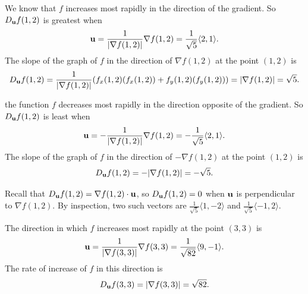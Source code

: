 \begin{activitySolution}
\item We know that $f$ increases most rapidly in the direction of the gradient. So $D_{\mathbf{u}}f(1,2)$ is greatest when \[\mathbf{u} = \frac{1}{|\nabla f(1,2)|} \nabla f(1,2) =  \frac{1}{\sqrt{5}}\langle 2,1 \rangle.\]
The slope of the graph of $f$ in the direction of $\nabla f(1,2)$ at the point $(1,2)$ is
\[D_{\mathbf{u}}f(1,2) = \frac{1}{|\nabla f(1,2)|}(f_x(1,2)(f_x(1,2)) + f_y(1,2)(f_y(1,2))) = |\nabla f(1,2)| = \sqrt{5}.\]

\item the function $f$ decreases most rapidly in the direction opposite of the gradient. So $D_{\mathbf{u}}f(1,2)$ is least when 
\[\mathbf{u} = -\frac{1}{|\nabla f(1,2)|} \nabla f(1,2) =  -\frac{1}{\sqrt{5}}\langle 2,1 \rangle.\]
The slope of the graph of $f$ in the direction of $-\nabla f(1,2)$ at the point $(1,2)$ is
\[D_{\mathbf{u}}f(1,2) = - |\nabla f(1,2)| = -\sqrt{5}.\] 

\item Recall that $D_{\mathbf{u}}f(1,2) = \nabla f(1,2) \cdot \mathbf{u}$, so $D_{\mathbf{u}}f(1,2) = 0$ when $\mathbf{u}$ is perpendicular to $\nabla f(1,2)$. By inspection, two such vectors are $\frac{1}{\sqrt{5}}\langle 1, -2 \rangle$ and $\frac{1}{\sqrt{5}}\langle -1,2 \rangle$.  

\item The direction in which $f$ increases most rapidly at the point $(3,3)$ is 
\[\mathbf{u}=\frac{1}{|\nabla f(3,3)|}\nabla f(3,3) = \frac{1}{\sqrt{82}}\langle 9, -1 \rangle.\]
The rate of increase of $f$ in this direction is 
\[D_{\mathbf{u}} f (3,3) = |\nabla f(3,3)| = \sqrt{82}.\]
\ea

\end{activitySolution}

\aftera
